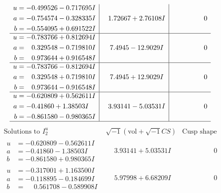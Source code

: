 \documentclass[1p]{elsarticle_modified}
\theoremstyle{definition}
\newcommand{\I}{\sqrt{-1}}
\begin{document}
$$\begin{array}{c|c|c}
\begin{aligned}
u &= -0.499526 - 0.717695 I \\
a &= -0.754574 - 0.328335 I \\
b &= -0.554095 + 0.691522 I\end{aligned}
 & \phantom{-}1.72667 + 2.76108 I & \phantom{-0.000000 } 0 \\ \hline\begin{aligned}
u &= -0.783766 + 0.812694 I \\
a &= \phantom{-}0.329548 - 0.719810 I \\
b &= \phantom{-}0.973644 + 0.916548 I\end{aligned}
 & \phantom{-}7.4945 - 12.9029 I & \phantom{-0.000000 } 0 \\ \hline\begin{aligned}
u &= -0.783766 - 0.812694 I \\
a &= \phantom{-}0.329548 + 0.719810 I \\
b &= \phantom{-}0.973644 - 0.916548 I\end{aligned}
 & \phantom{-}7.4945 + 12.9029 I & \phantom{-0.000000 } 0 \\ \hline\begin{aligned}
u &= -0.620809 + 0.562611 I \\
a &= -0.41860 + 1.38503 I \\
b &= -0.861580 - 0.980365 I\end{aligned}
 & \phantom{-}3.93141 - 5.03531 I & \phantom{-0.000000 } 0\\
 \hline 
 \end{array}$$\newpage$$\begin{array}{c|c|c}  
\text{Solutions to }I^u_{2}& \I (\text{vol} + \sqrt{-1}CS) & \text{Cusp shape}\\
 \hline 
\begin{aligned}
u &= -0.620809 - 0.562611 I \\
a &= -0.41860 - 1.38503 I \\
b &= -0.861580 + 0.980365 I\end{aligned}
 & \phantom{-}3.93141 + 5.03531 I & \phantom{-0.000000 } 0 \\ \hline\begin{aligned}
u &= -0.317001 + 1.163500 I \\
a &= -0.118895 - 0.184699 I \\
b &= \phantom{-}0.561708 - 0.589908 I\end{aligned}
 & \phantom{-}5.97998 + 6.68209 I & \phantom{-0.000000 } 0 \\ \hline\begin{aligned}

\end{aligned}
\end{array}$$
\end{document}
